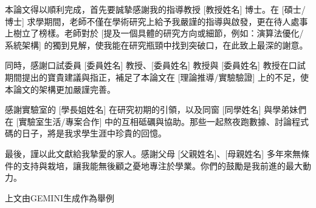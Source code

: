 本論文得以順利完成，首先要誠摯感謝我的指導教授 [教授姓名] 博士。在 [碩士/博士] 求學期間，老師不僅在學術研究上給予我嚴謹的指導與啟發，更在待人處事上樹立了榜樣。老師對於 [提及一個具體的研究方向或細節，例如：演算法優化/系統架構] 的獨到見解，使我能在研究瓶頸中找到突破口，在此致上最深的謝意。

同時，感謝口試委員 [委員姓名] 教授、[委員姓名] 教授與 [委員姓名] 教授在口試期間提出的寶貴建議與指正，補足了本論文在 [理論推導/實驗驗證] 上的不足，使本論文的架構更加嚴謹完善。

感謝實驗室的 [學長姐姓名] 在研究初期的引領，以及同窗 [同學姓名] 與學弟妹們在 [實驗室生活/專案合作] 中的互相砥礪與協助。那些一起熬夜跑數據、討論程式碼的日子，將是我求學生涯中珍貴的回憶。

最後，謹以此文獻給我摯愛的家人。感謝父母 [父親姓名]、[母親姓名] 多年來無條件的支持與栽培，讓我能無後顧之憂地專注於學業。你們的鼓勵是我前進的最大動力。

上文由GEMINI生成作為舉例



